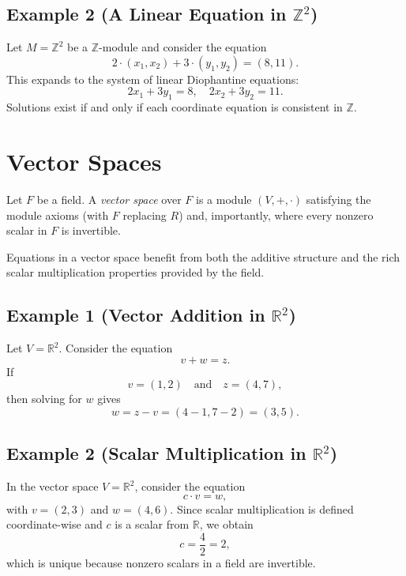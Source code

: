 \documentclass[11pt,openany]{article}
\begin{document}
\subsection*{Example 2 (A Linear Equation in \(\mathbb{Z}^2\))}
Let \(M=\mathbb{Z}^2\) be a \(\mathbb{Z}\)-module and consider the equation
\[
2\cdot (x_1,x_2) + 3\cdot (y_1,y_2) = (8,11).
\]
This expands to the system of linear Diophantine equations:
\[
2x_1+3y_1 = 8, \quad 2x_2+3y_2 = 11.
\]
Solutions exist if and only if each coordinate equation is consistent in \(\mathbb{Z}\).

\section{Vector Spaces}
\begin{definition}
	Let \(F\) be a field. A \emph{vector space} over \(F\) is a module \((V,+,\cdot)\) satisfying the module axioms (with \(F\) replacing \(R\)) and, importantly, where every nonzero scalar in \(F\) is invertible.
\end{definition}

Equations in a vector space benefit from both the additive structure and the rich scalar multiplication properties provided by the field.

\subsection*{Example 1 (Vector Addition in \(\mathbb{R}^2\))}
Let \(V=\mathbb{R}^2\). Consider the equation
\[
v + w = z.
\]
If
\[
v = (1,2) \quad \text{and} \quad z = (4,7),
\]
then solving for \(w\) gives
\[
w = z - v = (4-1,7-2) = (3,5).
\]

\subsection*{Example 2 (Scalar Multiplication in \(\mathbb{R}^2\))}
In the vector space \(V=\mathbb{R}^2\), consider the equation
\[
c \cdot v = w,
\]
with \(v=(2,3)\) and \(w=(4,6)\). Since scalar multiplication is defined coordinate-wise and \(c\) is a scalar from \(\mathbb{R}\), we obtain
\[
c = \frac{4}{2} = 2,
\]
which is unique because nonzero scalars in a field are invertible.
\end{document}
